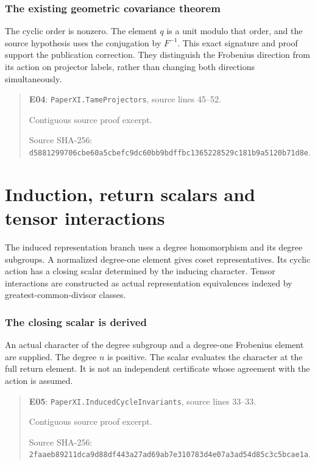 \documentclass[10pt,oneside]{book}
\begin{document}
\subsection{The existing geometric covariance theorem}
\label{guide:E04}
The cyclic order is nonzero. The element \(q\) is a unit modulo that order, and the source hypothesis uses the conjugation by \(F^{-1}\).
This exact signature and proof support the publication correction. They distinguish the Frobenius direction from its action on projector labels, rather than changing both directions simultaneously.

\begin{quote}\footnotesize\textbf{E04}: \nolinkurl{PaperXI.TameProjectors}, source lines 45--52.\par Contiguous source proof excerpt.\par Source SHA-256: {\scriptsize\texttt{d5881299706cbe60a5cbefc9dc60bb9bdffbc1365228529c181b9a5120b71d8e}}.\end{quote}


\chapter{Induction, return scalars and tensor interactions}
The induced representation branch uses a degree homomorphism and its degree subgroups. A normalized degree-one element gives coset representatives. Its cyclic action has a closing scalar determined by the inducing character. Tensor interactions are constructed as actual representation equivalences indexed by greatest-common-divisor classes.

\subsection{The closing scalar is derived}
\label{guide:E05}
An actual character of the degree subgroup and a degree-one Frobenius element are supplied. The degree \(n\) is positive.
The scalar evaluates the character at the full return element. It is not an independent certificate whose agreement with the action is assumed.

\begin{quote}\footnotesize\textbf{E05}: \nolinkurl{PaperXI.InducedCycleInvariants}, source lines 33--33.\par Contiguous source proof excerpt.\par Source SHA-256: {\scriptsize\texttt{2faaeb89211dca9d88df443a27ad69ab7e310783d4e07a3ad54d85c3c5bcae1a}}.\end{quote}
\end{document}
